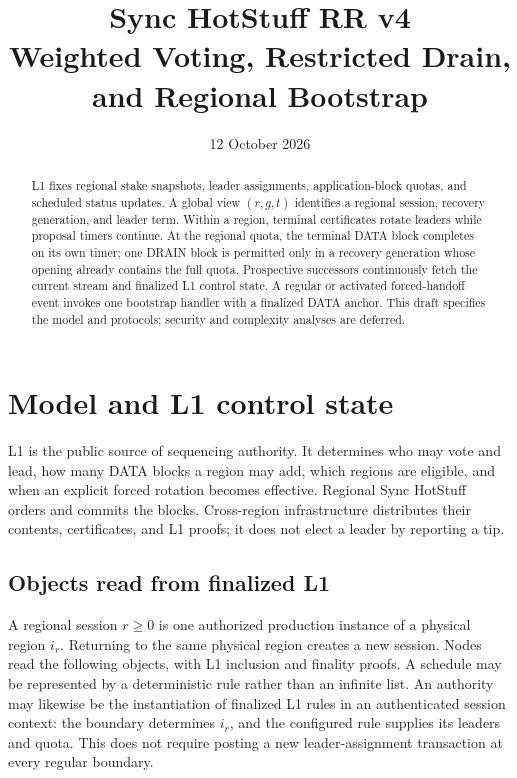 \documentclass[11pt,a4paper]{article}
\title{Sync HotStuff RR v4\\\large Weighted Voting, Restricted Drain, and Regional Bootstrap}
\author{}\date{12 October 2026}
\newcounter{protocol}
\begin{document}
\maketitle
\begin{abstract}
L1 fixes regional stake snapshots, leader assignments, application-block
quotas, and scheduled status updates. A global view $(r,g,t)$ identifies
a regional session, recovery generation, and leader term. Within a region,
terminal certificates rotate leaders while proposal timers continue.
At the regional quota, the terminal DATA block completes on its own timer;
one DRAIN block is permitted only in a recovery generation whose opening
already contains the full quota. Prospective successors continuously fetch
the current stream and finalized L1 control state. A regular or activated
forced-handoff event invokes one bootstrap handler with a finalized DATA
anchor. This draft specifies the model and protocols; security and
complexity analyses are deferred.
\end{abstract}

\section{Model and L1 control state}
\label{sec:model}
L1 is the public source of sequencing authority. It determines who may
vote and lead, how many DATA blocks a region may add, which regions are
eligible, and when an explicit forced rotation becomes effective.
Regional Sync HotStuff~\cite{sync} orders and commits the blocks.
Cross-region infrastructure distributes their contents, certificates, and
L1 proofs; it does not elect a leader by reporting a tip.

\subsection{Objects read from finalized L1}
\label{sec:l1}
A regional session $r\ge0$ is one authorized production instance of a
physical region $i_r$. Returning to the same physical region creates a
new session. Nodes read the following objects, with L1 inclusion and
finality proofs. A schedule may be represented by a deterministic rule
rather than an infinite list.
An authority may likewise be the instantiation of finalized L1 rules in
an authenticated session context: the boundary determines $i_r$, and the
configured rule supplies its leaders and quota. This does not require
posting a new leader-assignment transaction at every regular boundary.
\end{document}
